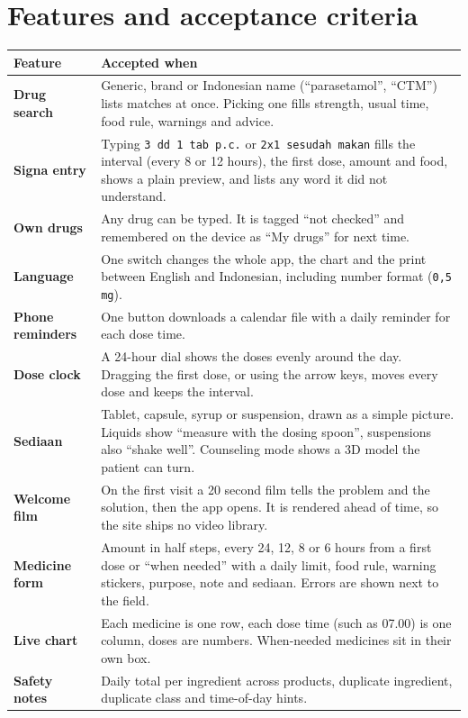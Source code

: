 \documentclass[11pt]{article}
\begin{document}
\section{Features and acceptance criteria}
\begin{tabularx}{\linewidth}{@{}>{\bfseries}p{32mm}X@{}}
\toprule
Feature & Accepted when \\
\midrule
Drug search & Generic, brand or Indonesian name (``parasetamol'', ``CTM'') lists matches at once. Picking one fills strength, usual time, food rule, warnings and advice. \\
Signa entry & Typing \texttt{3 dd 1 tab p.c.} or \texttt{2x1 sesudah makan} fills the interval (every 8 or 12 hours), the first dose, amount and food, shows a plain preview, and lists any word it did not understand. \\
Own drugs & Any drug can be typed. It is tagged ``not checked'' and remembered on the device as ``My drugs'' for next time. \\
Language & One switch changes the whole app, the chart and the print between English and Indonesian, including number format (\texttt{0,5 mg}). \\
Phone reminders & One button downloads a calendar file with a daily reminder for each dose time. \\
Dose clock & A 24-hour dial shows the doses evenly around the day. Dragging the first dose, or using the arrow keys, moves every dose and keeps the interval. \\
Sediaan & Tablet, capsule, syrup or suspension, drawn as a simple picture. Liquids show ``measure with the dosing spoon'', suspensions also ``shake well''. Counseling mode shows a 3D model the patient can turn. \\
Welcome film & On the first visit a 20 second film tells the problem and the solution, then the app opens. It is rendered ahead of time, so the site ships no video library. \\
Medicine form & Amount in half steps, every 24, 12, 8 or 6 hours from a first dose or ``when needed'' with a daily limit, food rule, warning stickers, purpose, note and sediaan. Errors are shown next to the field. \\
Live chart & Each medicine is one row, each dose time (such as 07.00) is one column, doses are numbers. When-needed medicines sit in their own box. \\
Safety notes & Daily total per ingredient across products, duplicate ingredient, duplicate class and time-of-day hints. \\

\end{tabularx}
\end{document}
